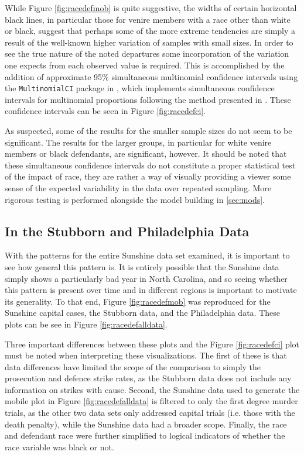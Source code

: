While Figure \ref{fig:racedefmob} is quite suggestive, the widths of certain horizontal black lines, in particular those for
venire members with a race other than white or black, suggest that perhaps some of the more extreme tendencies are simply a result
of the well-known higher variation of samples with small sizes. In order to see the true nature of the noted departures some
incorporation of the variation one expects from each observed value is required. This is accomplished by the addition of
approximate 95\%  simultaneous multinomial confidence intervals using the \texttt{MultinomialCI} package in \Rp, which implements
simultaneous confidence intervals for multinomial proportions following the method presented in \cite{sison1995}. These confidence
intervals can be seen in Figure \ref{fig:racedefci}.

As suspected, some of the results for the smaller sample sizes do not seem to be significant. The results for the larger groups,
in particular for white venire members or black defendants, are significant, however. It should be noted that these simultaneous
confidence intervals do not constitute a proper statistical test of the impact of race, they are rather a way of visually
providing a viewer some sense of the expected variability in the data over repeated sampling. More rigorous testing is performed
alongside the model building in \ref{sec:mods}.

\subsection{In the Stubborn and Philadelphia Data}

With the patterns for the entire Sunshine data set examined, it is important to see how general this pattern is. It is entirely
possible that the Sunshine data simply shows a particularly bad year in North Carolina, and so seeing whether this pattern is
present over time and in different regions is important to motivate its generality. To that end, Figure \ref{fig:racedefmob} was
reproduced for the Sunshine capital cases, the Stubborn data, and the Philadelphia data. These plots can be see in Figure 
\ref{fig:racedefalldata}.

Three important differences between these plots and the Figure \ref{fig:racedefci} plot must be noted when interpreting these
visualizations. The first of these is that data differences have limited the scope of the comparison to simply the prosecution and
defence strike rates, as the Stubborn data does not include any information on strikes with cause. Second, the Sunshine data used
to generate the mobile plot in Figure \ref{fig:racedefalldata} is filtered to only the first degree murder trials, as the other
two data sets only addressed capital trials (i.e. those with the death penalty), while the Sunshine data had a broader
scope. Finally, the race and defendant race were further simplified to logical indicators of whether the race variable was black
or not.

